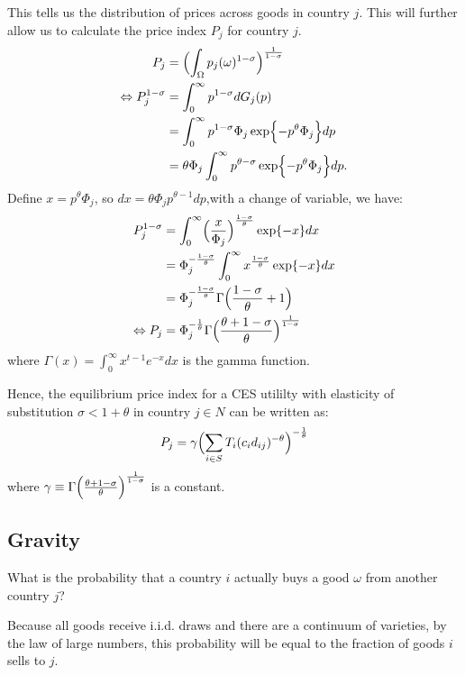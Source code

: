 This tells us the distribution of prices across goods in country $j$.
This will further allow us to calculate the price index $P_j$ for country $j$.
\begin{align*}
    P_j &= \Bigl( \int_{\Omega}p_j(\omega)^{1-\sigma} \Bigr)^{\frac{1}{1-\sigma}} \\
    \Leftrightarrow P_j^{1-\sigma} &= \int_0^{\infty} p^{1-\sigma} d G_j(p)\\
    &= \int_0^{\infty} p^{1-\sigma} \Phi_j \exp \Bigl\{-p^{\theta} \Phi_j \Bigr\} dp \\
    &= \theta \Phi_j \int_0^{\infty} p^{\theta - \sigma} \exp \Bigl\{-p^{\theta} \Phi_j \Bigr\} dp.
\end{align*}
Define $x = p^{\theta} \Phi_j$, so $dx = \theta \Phi_j p^{\theta-1} dp$,with a change of variable, we have:
\begin{align*}
    P_j^{1-\sigma} &= \int_0^{\infty} \Bigl( \frac{x}{\Phi_j} \Bigr)^{\frac{1-\sigma}{\theta}} \exp\{-x\} dx \\
    &= \Phi_j^{-\frac{1-\sigma}{\theta}} \int_0^{\infty} x^{\frac{1-\sigma}{\theta}} \exp\{-x\} dx \\
    &= \Phi_j^{-\frac{1-\sigma}{\theta}} \Gamma \Bigl( \frac{1-\sigma}{\theta} + 1 \Bigr) \\
    \Leftrightarrow P_j &= \Phi_j^{-\frac{1}{\theta}} \Gamma \Bigl( \frac{\theta + 1 - \sigma}{\theta} \Bigr)^{\frac{1}{1-\sigma}}
\end{align*}
where $\Gamma(x) = \int_0^{\infty} x^{t-1} e^{-x} dx$ is the gamma function.

Hence, the equilibrium price index for a CES utililty with elasticity of substitution $\sigma < 1+\theta$ in country $j \in N$ can be written as:
\[
P_j = \gamma \Bigl( \sum_{i \in S} T_i (c_i d_{ij})^{-\theta} \Bigr)^{-\frac{1}{\theta}} 
\]
where $\gamma \equiv \Gamma \Bigl( \frac{\theta + 1 - \sigma}{\theta} \Bigr)^{\frac{1}{1-\sigma}}$ is a constant.

\subsection{Gravity}

What is the probability that a country $i$ actually buys a good $\omega$ from another country $j$?

Because all goods receive i.i.d. draws and there are a continuum of varieties, 
by the law of large numbers, this probability will be equal to the fraction of goods $i$ sells to $j$.

